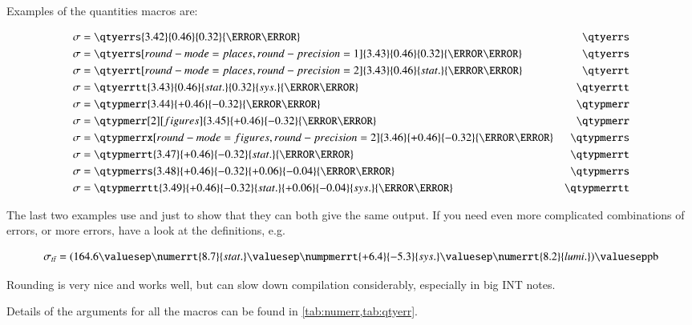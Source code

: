 \documentclass[REPORT=false, UKenglish]{atlasdoc}
\begin{document}
Examples of the quantities macros are:
\begin{tcblisting}{}
\begin{align*}
  \sigma & = \qtyerrs{3.42}{0.46}{0.32}{\pico\barn} & \Macro{qtyerrs}\\
  \sigma & = \qtyerrs[round-mode=places, round-precision=1]{3.43}{0.46}{0.32}{\pico\barn} & \Macro{qtyerrs}\\
  \sigma & = \qtyerrt[round-mode=places, round-precision=2]{3.43}{0.46}{stat.}{\pico\barn} & \Macro{qtyerrt}\\
  \sigma & = \qtyerrtt{3.43}{0.46}{stat.}{0.32}{sys.}{\pico\barn} & \Macro{qtyerrtt}\\
  \sigma & = \qtypmerr{3.44}{+0.46}{-0.32}{\pico\barn} & \Macro{qtypmerr}\\
  \sigma & = \qtypmerr[2][figures]{3.45}{+0.46}{-0.32}{\pico\barn} & \Macro{qtypmerr}\\
  \sigma & = \qtypmerrx[round-mode=figures, round-precision=2]{3.46}{+0.46}{-0.32}{\pico\barn} & \Macro{qtypmerrs}\\
  \sigma & = \qtypmerrt{3.47}{+0.46}{-0.32}{stat.}{\pico\barn} & \Macro{qtypmerrt}\\
  \sigma & = \qtypmerrs{3.48}{+0.46}{-0.32}{+0.06}{-0.04}{\pico\barn} & \Macro{qtypmerrs}\\
  \sigma & = \qtypmerrtt{3.49}{+0.46}{-0.32}{stat.}{+0.06}{-0.04}{sys.}{\pico\barn} & \Macro{qtypmerrtt}
\end{align*}
\end{tcblisting}
The last two examples use  and  just
to show that they can both give the same output. If you need even more
complicated combinations of errors, or more errors, have a look at the
definitions, e.g.
\begin{tcblisting}{}
\begin{equation*}
  \sigma_{t\bar{t}} = (\num{164.6}%
  \valuesep\numerrt{8.7}{stat.}%
  \valuesep\numpmerrt{+6.4}{-5.3}{sys.}%
  \valuesep\numerrt{8.2}{lumi.})%
  \valuesep\unit{\pico\barn}
\end{equation*}    
\end{tcblisting}

Rounding is very nice and works well, but can slow down compilation considerably,
especially in big INT notes.

Details of the arguments for all the macros can be found in \cref{tab:numerr,tab:qtyerr}.
\end{document}
